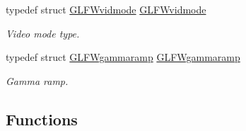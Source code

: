 \begin{DoxyCompactItemize}
typedef struct \hyperlink{structGLFWvidmode}{G\+L\+F\+Wvidmode} \hyperlink{group__monitor_gae48aadf4ea0967e6605c8f58fa5daccb}{G\+L\+F\+Wvidmode}
\begin{DoxyCompactList}\small\item\em Video mode type. \end{DoxyCompactList}\item 
typedef struct \hyperlink{structGLFWgammaramp}{G\+L\+F\+Wgammaramp} \hyperlink{group__monitor_gaec0bd37af673be8813592849f13e02f0}{G\+L\+F\+Wgammaramp}
\begin{DoxyCompactList}\small\item\em Gamma ramp. \end{DoxyCompactList}\end{DoxyCompactItemize}
\subsection*{Functions}
